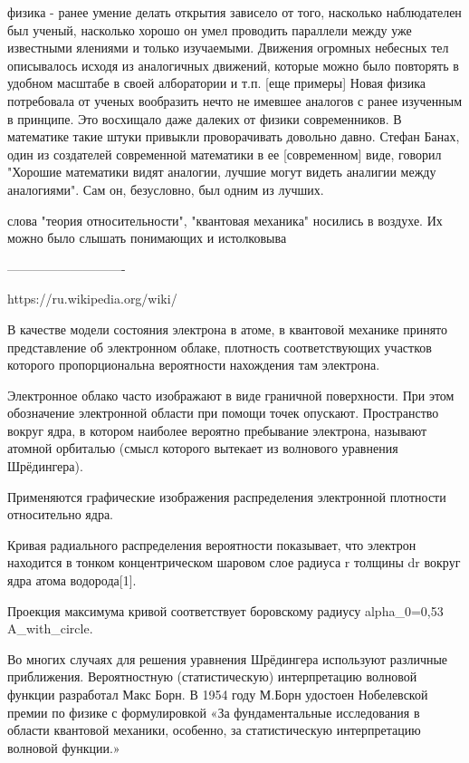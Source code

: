 физика - ранее умение делать открытия зависело от того, насколько наблюдателен был ученый, насколько хорошо он умел проводить параллели между уже известными ялениями и только изучаемыми.
Движения огромных небесных тел описывалось исходя из аналогичных движений, которые можно было повторять в удобном масштабе в своей алборатории и т.п. [еще примеры]
Новая физика потребовала от ученых вообразить нечто не имевшее аналогов с ранее изученным в принципе. 
Это восхищало даже далеких от физики современников.
В математике такие штуки привыкли проворачивать довольно давно. 
Стефан Банах, один из создателей современной математики в ее [современном] виде, говорил "Хорошие математики видят аналогии, лучшие могут видеть аналигии между аналогиями". Сам он, безусловно, был одним из лучших.

 
слова "теория относительности", "квантовая механика" носились в воздухе. Их можно было слышать  понимающих и истолковыва

----------------------------



https://ru.wikipedia.org/wiki/%
{
В качестве модели состояния электрона в атоме, в квантовой механике принято представление об электронном облаке, плотность соответствующих участков которого пропорциональна вероятности нахождения там электрона.

Электронное облако часто изображают в виде граничной поверхности. При этом обозначение электронной области при помощи точек опускают. Пространство вокруг ядра, в котором наиболее вероятно пребывание электрона, называют атомной орбиталью (смысл которого вытекает из волнового уравнения Шрёдингера).

Применяются графические изображения распределения электронной плотности относительно ядра.

Кривая радиального распределения вероятности показывает, что электрон находится в тонком концентрическом шаровом слое радиуса r толщины dr вокруг ядра атома водорода[1].

Проекция максимума кривой соответствует боровскому радиусу alpha_0=0,53 A_with_circle.

Во многих случаях для решения уравнения Шрёдингера используют различные приближения. Вероятностную (статистическую) интерпретацию волновой функции разработал Макс Борн. В 1954 году М.Борн удостоен Нобелевской премии по физике с формулировкой «За фундаментальные исследования в области квантовой механики, особенно, за статистическую интерпретацию волновой функции.»
}

